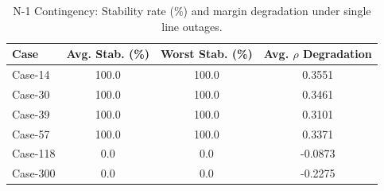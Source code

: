 \begin{table}[t]
\centering
\caption{N-1 Contingency: Stability rate (\%) and margin degradation under single line outages.}
\label{tab:n1}
\begin{tabular}{lccc}
\toprule
Case & Avg. Stab. (\%) & Worst Stab. (\%) & Avg. $\rho$ Degradation \\
\midrule
Case-14 & 100.0 & 100.0 & 0.3551 \\
Case-30 & 100.0 & 100.0 & 0.3461 \\
Case-39 & 100.0 & 100.0 & 0.3101 \\
Case-57 & 100.0 & 100.0 & 0.3371 \\
Case-118 & 0.0 & 0.0 & -0.0873 \\
Case-300 & 0.0 & 0.0 & -0.2275 \\
\bottomrule
\end{tabular}
\end{table}